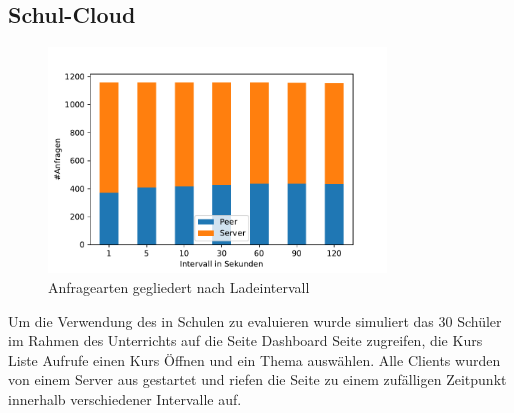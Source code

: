 

\subsection{Schul-Cloud}
\begin{figure}[!h]
	\centering
	\includegraphics[width=0.8\textwidth]{figures/sc_stacked_interval}
	\caption[A Figure Short-Title]{Anfragearten gegliedert nach Ladeintervall}
	\label{fig:sc_stacked_interval}
\end{figure}
Um die Verwendung des \cdns in Schulen zu evaluieren wurde simuliert das 30 Schüler im Rahmen des Unterrichts auf die Seite Dashboard Seite zugreifen, die Kurs Liste Aufrufe einen Kurs Öffnen und ein Thema auswählen. Alle Clients wurden von einem Server aus gestartet und riefen die Seite zu einem zufälligen Zeitpunkt innerhalb verschiedener Intervalle auf. 

